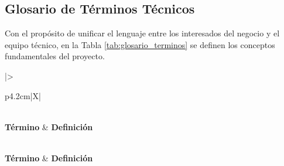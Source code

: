 \subsection{Glosario de Términos Técnicos}

Con el propósito de unificar el lenguaje entre los interesados del negocio y el equipo técnico, en la Tabla \ref{tab:glosario_terminos} se definen los conceptos fundamentales del proyecto.

{\small
\begin{xltabular}{\textwidth}{|>{\raggedright\arraybackslash}p{4.2cm}|X|}
    \caption{Glosario de términos técnicos y del dominio del negocio}
    \label{tab:glosario_terminos} \\
    \hline
    \textbf{Término} & \textbf{Definición} \\
    \hline
    \endfirsthead

     \\
    \hline
    \textbf{Término} & \textbf{Definición} \\
    \hline
    \endhead

     \\
    \endfoot

    \endlastfoot


\end{xltabular}}
